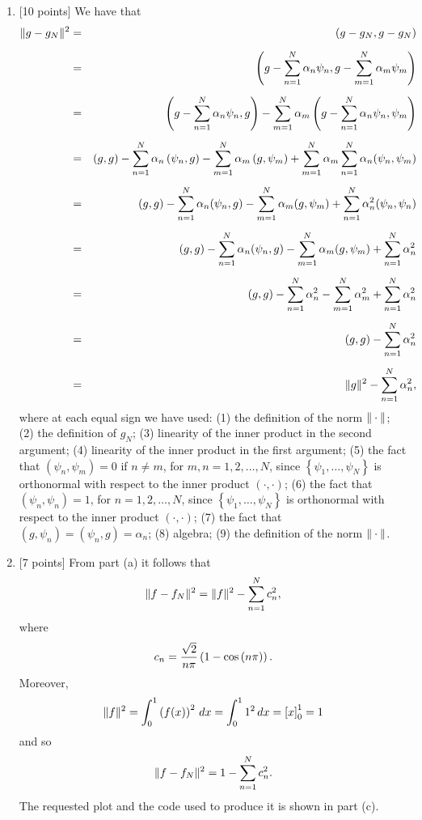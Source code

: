 \begin{solution}
\begin{enumerate}
\item {[10 points]} We have that
\begin{eqnarray*}
   \|g-g_N\|^2 &=& \left( g-g_N, g-g_N\right) \\[0.5em]
 &=& \left( g - \sum_{n=1}^N \alpha_n \psi_n,
                           g - \sum_{m=1}^N \alpha_m \psi_m\right) \\[0.5em]
 &=& \left( g - \sum_{n=1}^N \alpha_n \psi_n, g\right) 
              -\sum_{m=1}^N \alpha_m \left( g - \sum_{n=1}^N \alpha_n \psi_n,   \psi_m\right) \\[0.5em]
 &=& \left(g,g\right) - \sum_{n=1}^N \alpha_n\left( \psi_n, g\right) 
              - \sum_{m=1}^N \alpha_m\left( g,   \psi_m\right) 
           +  \sum_{m=1}^N \alpha_m \sum_{n=1}^N \alpha_n (\psi_n, \psi_m) \\[0.5em]
 &=& (g,g) - \sum_{n=1}^N \alpha_n (\psi_n, g) 
           - \sum_{m=1}^N \alpha_m (g,\psi_m)
           + \sum_{n=1}^N \alpha_n^2  (\psi_n, \psi_n)\\[0.5em]
 &=& (g,g) - \sum_{n=1}^N \alpha_n (\psi_n, g) 
           - \sum_{m=1}^N \alpha_m (g,\psi_m)
           + \sum_{n=1}^N \alpha_n^2\\[0.5em]
 &=& (g,g) - \sum_{n=1}^N \alpha_n^2  
           - \sum_{m=1}^N \alpha_m^2 
           + \sum_{n=1}^N \alpha_n^2 \\[0.5em]
 &=& (g,g) - \sum_{n=1}^N \alpha_n^2 \\[0.5em]
 &=& \|g\|^2 - \sum_{n=1}^N \alpha_n^2,
\end{eqnarray*}
where at each equal sign we have used:
(1) the definition of the norm $\|\cdot\|$;
(2) the definition of $g_N$;
(3) linearity of the inner product in the second argument;
(4) linearity of the inner product in the first argument;
(5) the fact that $(\psi_n,\psi_m) = 0$ if $n\ne m$, for $m,n=1,2,\ldots,N$, since $\left\{\psi_1,\ldots,\psi_N\right\}$ is orthonormal with respect to the inner product $(\cdot,\cdot)$;
(6) the fact that $(\psi_n,\psi_n) = 1$, for $n=1,2,\ldots,N$, since $\left\{\psi_1,\ldots,\psi_N\right\}$ is orthonormal with respect to the inner product $(\cdot,\cdot)$;
(7) the fact that $(g,\psi_n) = (\psi_n,g) = \alpha_n$;
(8) algebra;
(9) the definition of the norm $\|\cdot\|$.

\item {[7 points]} From part (a) it follows that
\[
\|f-f_N\|^2 = \|f\|^2 - \sum_{n=1}^N c_n^2,
\]
where
\[
c_n={\sqrt{2} \over n\pi}\left(1-\cos\left(n\pi\right)\right).
\]
Moreover,
\[
\|f\|^2=\int_0^1\left(f(x)\right)^2\,dx=\int_0^11^2\,dx=\left[x\right]_0^1=1
\]
and so
\[
\|f-f_N\|^2 = 1 - \sum_{n=1}^N c_n^2.
\]
The requested plot and the code used to produce it is shown in part (c).


\end{enumerate}
\end{solution}
